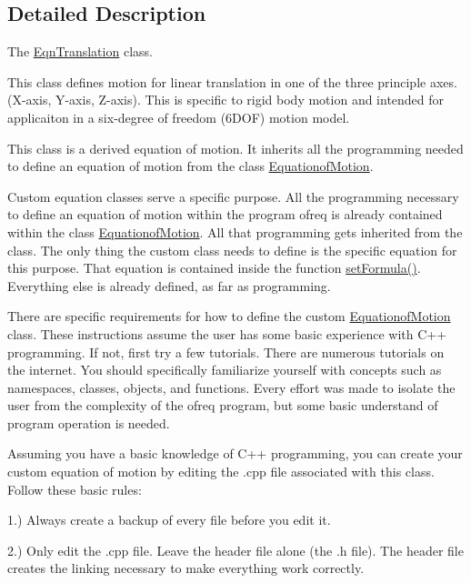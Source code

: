 \subsection{Detailed Description}
The \hyperlink{classosea_1_1ofreq_1_1_eqn_translation}{Eqn\-Translation} class. 

This class defines motion for linear translation in one of the three principle axes. (X-\/axis, Y-\/axis, Z-\/axis). This is specific to rigid body motion and intended for applicaiton in a six-\/degree of freedom (6\-D\-O\-F) motion model. 

 This class is a derived equation of motion. It inherits all the programming needed to define an equation of motion from the class \hyperlink{classosea_1_1ofreq_1_1_equationof_motion}{Equationof\-Motion}.

Custom equation classes serve a specific purpose. All the programming necessary to define an equation of motion within the program ofreq is already contained within the class \hyperlink{classosea_1_1ofreq_1_1_equationof_motion}{Equationof\-Motion}. All that programming gets inherited from the class. The only thing the custom class needs to define is the specific equation for this purpose. That equation is contained inside the function \hyperlink{classosea_1_1ofreq_1_1_eqn_translation_af2681a6f73df8e8518d81eba5ac9152e}{set\-Formula()}. Everything else is already defined, as far as programming.

There are specific requirements for how to define the custom \hyperlink{classosea_1_1ofreq_1_1_equationof_motion}{Equationof\-Motion} class. These instructions assume the user has some basic experience with C++ programming. If not, first try a few tutorials. There are numerous tutorials on the internet. You should specifically familiarize yourself with concepts such as namespaces, classes, objects, and functions. Every effort was made to isolate the user from the complexity of the ofreq program, but some basic understand of program operation is needed.

Assuming you have a basic knowledge of C++ programming, you can create your custom equation of motion by editing the .cpp file associated with this class. Follow these basic rules\-:

1.) Always create a backup of every file before you edit it.

2.) Only edit the .cpp file. Leave the header file alone (the .h file). The header file creates the linking necessary to make everything work correctly.

